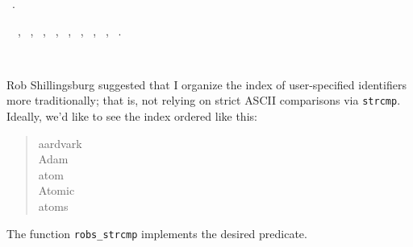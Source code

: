 \documentclass{report}
\begin{document}
\begin{flushleft}
\begin{minipage}{\linewidth}
\vspace{-1ex}
\footnotesize\addtolength{\baselineskip}{-1ex}
\begin{list}{}{\setlength{\itemsep}{-\parsep}\setlength{\itemindent}{-\leftmargin}}
\item \NWtxtFileDefBy\ .
\end{list}
\vspace{-2ex}
\footnotesize\addtolength{\baselineskip}{-1ex}
\begin{list}{}{\setlength{\itemsep}{-\parsep}\setlength{\itemindent}{-\leftmargin}}
\item \NWtxtIdentsUsed\nobreak\  \verb@compare@\nobreak\ , \verb@EQUAL@\nobreak\ , \verb@EXTENSION@\nobreak\ , \verb@FALSE@\nobreak\ , \verb@GREATER@\nobreak\ , \verb@LESS@\nobreak\ , \verb@Name@\nobreak\ , \verb@PREFIX@\nobreak\ , \verb@TRUE@\nobreak\ .\end{list}
\end{minipage}\\[4ex]
\end{flushleft}
Rob Shillingsburg suggested that I organize the index of
user-specified identifiers more traditionally; that is, not relying on
strict {\small ASCII} comparisons via \verb|strcmp|. Ideally, we'd like
to see the index ordered like this:
\begin{quote}
\begin{flushleft}
aardvark \\
Adam \\
atom \\
Atomic \\
atoms
\end{flushleft}
\end{quote}
The function \verb|robs_strcmp| implements the desired predicate.
\end{document}
